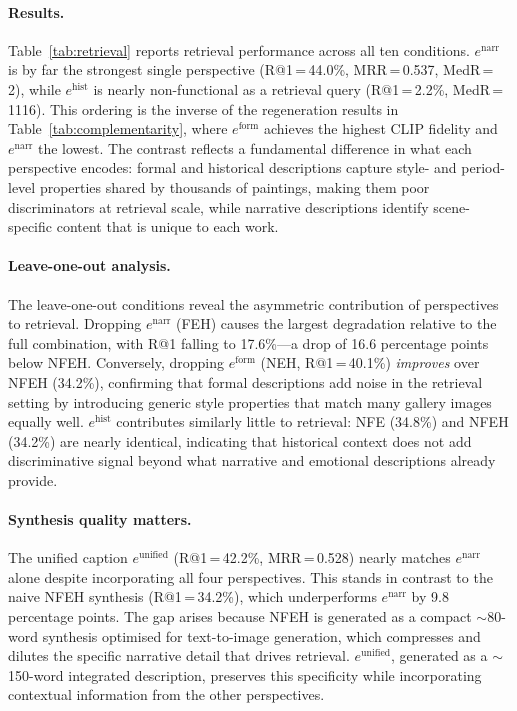 \paragraph{Results.}
Table~\ref{tab:retrieval} reports retrieval performance across all ten conditions.
$e^{\text{narr}}$ is by far the strongest single perspective (R@1\,=\,44.0\%, MRR\,=\,0.537, MedR\,=\,2), while $e^{\text{hist}}$ is nearly non-functional as a retrieval query (R@1\,=\,2.2\%, MedR\,=\,1116).
This ordering is the inverse of the regeneration results in Table~\ref{tab:complementarity}, where $e^{\text{form}}$ achieves the highest CLIP fidelity and $e^{\text{narr}}$ the lowest.
The contrast reflects a fundamental difference in what each perspective encodes: formal and historical descriptions capture style- and period-level properties shared by thousands of paintings, making them poor discriminators at retrieval scale, while narrative descriptions identify scene-specific content that is unique to each work.

\paragraph{Leave-one-out analysis.}
The leave-one-out conditions reveal the asymmetric contribution of perspectives to retrieval.
Dropping $e^{\text{narr}}$ (FEH) causes the largest degradation relative to the full combination, with R@1 falling to 17.6\%---a drop of 16.6 percentage points below NFEH.
Conversely, dropping $e^{\text{form}}$ (NEH, R@1\,=\,40.1\%) \emph{improves} over NFEH (34.2\%), confirming that formal descriptions add noise in the retrieval setting by introducing generic style properties that match many gallery images equally well.
$e^{\text{hist}}$ contributes similarly little to retrieval: NFE (34.8\%) and NFEH (34.2\%) are nearly identical, indicating that historical context does not add discriminative signal beyond what narrative and emotional descriptions already provide.

\paragraph{Synthesis quality matters.}
The unified caption $e^{\text{unified}}$ (R@1\,=\,42.2\%, MRR\,=\,0.528) nearly matches $e^{\text{narr}}$ alone despite incorporating all four perspectives.
This stands in contrast to the naive NFEH synthesis (R@1\,=\,34.2\%), which underperforms $e^{\text{narr}}$ by 9.8 percentage points.
The gap arises because NFEH is generated as a compact $\sim$80-word synthesis optimised for text-to-image generation, which compresses and dilutes the specific narrative detail that drives retrieval.
$e^{\text{unified}}$, generated as a $\sim$150-word integrated description, preserves this specificity while incorporating contextual information from the other perspectives.

